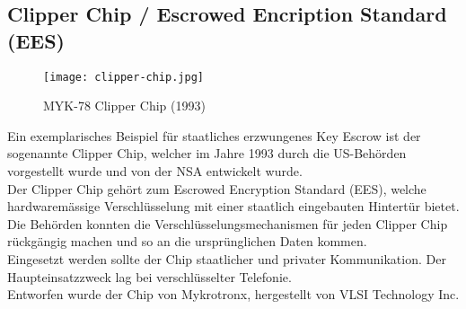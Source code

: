 	\subsection{Clipper Chip / Escrowed Encription Standard (EES)}
\begin{figure}[H]
	\centering
	\texttt{[image: clipper-chip.jpg]}
	\caption{MYK-78 Clipper Chip (1993)}
	\label{fig:clipper-chip}
\end{figure}
Ein exemplarisches Beispiel für staatliches erzwungenes Key Escrow ist der sogenannte Clipper Chip, welcher im Jahre 1993 durch die US-Behörden vorgestellt wurde und von der NSA entwickelt wurde.\\
Der Clipper Chip gehört zum Escrowed Encryption Standard (EES), welche hardwaremässige Verschlüsselung mit einer staatlich eingebauten Hintertür bietet. Die Behörden konnten die Verschlüsselungsmechanismen für jeden Clipper Chip rückgängig machen und so an die ursprünglichen Daten kommen. \\
Eingesetzt werden sollte der Chip staatlicher und privater Kommunikation. Der Haupteinsatzzweck lag bei verschlüsselter Telefonie. \cite{ees}\\
Entworfen wurde der Chip von Mykrotronx, hergestellt von VLSI Technology Inc. \\

